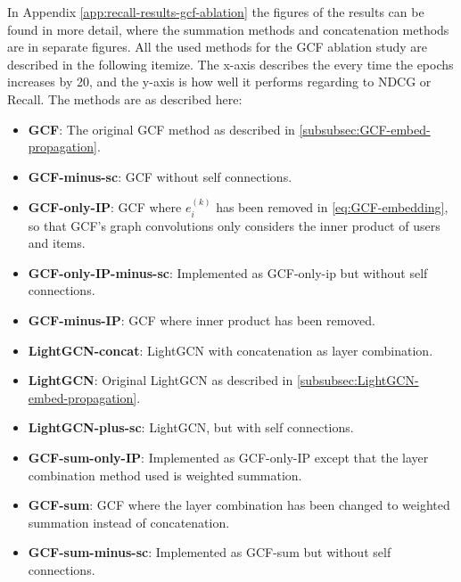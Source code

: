 In Appendix \ref{app:recall-results-gcf-ablation} the figures of the results can be found in more detail, where the summation methods and concatenation methods are in separate figures.
All the used methods for the GCF ablation study are described in the following itemize.
The x-axis describes the every time the epochs increases by 20, and the y-axis is how well it performs regarding to NDCG or Recall.
The methods are as described here:\\
\begin{itemize}
    \item \textbf{GCF}: The original GCF method as described in \autoref{subsubsec:GCF-embed-propagation}.
    \item \textbf{GCF-minus-sc}: GCF without self connections.
    \item \textbf{GCF-only-IP}:  GCF where $e_i^{(k)}$ has been removed in \autoref{eq:GCF-embedding}, so that GCF's graph convolutions only considers the inner product of users and items.
    \item \textbf{GCF-only-IP-minus-sc}: Implemented as GCF-only-ip but without self connections.
    \item \textbf{GCF-minus-IP}: GCF where inner product has been removed.
    \item \textbf{LightGCN-concat}: LightGCN with concatenation as layer combination.
    \item \textbf{LightGCN}: Original LightGCN as described in \autoref{subsubsec:LightGCN-embed-propagation}.
    \item \textbf{LightGCN-plus-sc}: LightGCN, but with self connections.
    \item \textbf{GCF-sum-only-IP}: Implemented as GCF-only-IP except that the layer combination method used is weighted summation.
    \item \textbf{GCF-sum}: GCF where the layer combination has been changed to weighted summation instead of concatenation.
    \item \textbf{GCF-sum-minus-sc}: Implemented as GCF-sum but without self connections.
\end{itemize}
